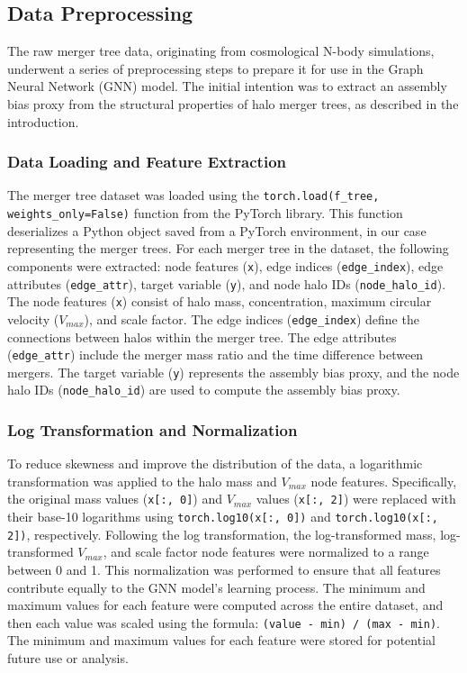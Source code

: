\documentclass[twocolumn]{aastex631}
\begin{document}
\subsection{Data Preprocessing}

The raw merger tree data, originating from cosmological N-body simulations, underwent a series of preprocessing steps to prepare it for use in the Graph Neural Network (GNN) model. The initial intention was to extract an assembly bias proxy from the structural properties of halo merger trees, as described in the introduction.

\subsubsection{Data Loading and Feature Extraction}
The merger tree dataset was loaded using the \texttt{torch.load(f\_tree, weights\_only=False)} function from the PyTorch library. This function deserializes a Python object saved from a PyTorch environment, in our case representing the merger trees. For each merger tree in the dataset, the following components were extracted: node features (\texttt{x}), edge indices (\texttt{edge\_index}), edge attributes (\texttt{edge\_attr}), target variable (\texttt{y}), and node halo IDs (\texttt{node\_halo\_id}). The node features (\texttt{x}) consist of halo mass, concentration, maximum circular velocity ($V_{max}$), and scale factor. The edge indices (\texttt{edge\_index}) define the connections between halos within the merger tree. The edge attributes (\texttt{edge\_attr}) include the merger mass ratio and the time difference between mergers. The target variable (\texttt{y}) represents the assembly bias proxy, and the node halo IDs (\texttt{node\_halo\_id}) are used to compute the assembly bias proxy.

\subsubsection{Log Transformation and Normalization}
To reduce skewness and improve the distribution of the data, a logarithmic transformation was applied to the halo mass and $V_{max}$ node features. Specifically, the original mass values (\texttt{x[:, 0]}) and $V_{max}$ values (\texttt{x[:, 2]}) were replaced with their base-10 logarithms using \texttt{torch.log10(x[:, 0])} and \texttt{torch.log10(x[:, 2])}, respectively. Following the log transformation, the log-transformed mass, log-transformed $V_{max}$, and scale factor node features were normalized to a range between 0 and 1. This normalization was performed to ensure that all features contribute equally to the GNN model's learning process. The minimum and maximum values for each feature were computed across the entire dataset, and then each value was scaled using the formula: \texttt{(value - min) / (max - min)}. The minimum and maximum values for each feature were stored for potential future use or analysis.
\end{document}
